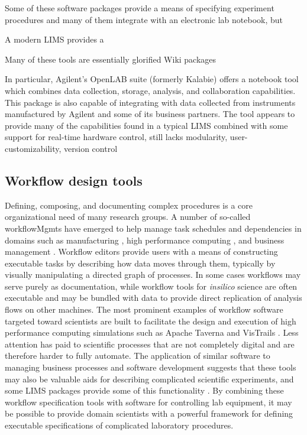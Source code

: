 \documentclass[../thesis]{subfiles}
\begin{document}
Some of these software packages provide a means of specifying
experiment procedures and many of them integrate with an electronic
lab notebook, but

A modern \gls{LIMS} provides a

Many of these tools are essentially glorified Wiki packages

In particular, Agilent's OpenLAB suite (formerly Kalabie) offers a
notebook tool which combines data collection, storage, analysis, and
collaboration capabilities. This package is also capable of
integrating with data collected from instruments manufactured by
Agilent and some of its business partners. The tool appears to provide
many of the capabilities found in a typical \gls{LIMS} combined with some
support for real-time hardware control,
 still lacks modularity, user-customizability, version control




\subsection{Workflow design tools}

Defining, composing, and documenting complex procedures is a core
organizational need of many research groups. A number of so-called
\glspl{workflowMgmt} have emerged to help manage task schedules and
dependencies in domains such as manufacturing
\cite{Allweyer:2010:BPM:1841147}, high performance computing
\cite{VisTrails}, and business management
\cite{cardoso2004workflow}. Workflow editors provide users with a
means of constructing executable tasks by describing how
data moves through them, typically by visually manipulating a directed
graph of processes. In some cases workflows may serve purely as
documentation, while workflow tools for \textit{\gls{insilico}} science
are often executable and may be bundled with data to provide direct
replication of analysis flows on other machines. The most prominent
examples of workflow software
targeted toward scientists are built to facilitate the design and
execution of high performance computing simulations such as Apache
Taverna \cite{Taverna} and VisTrails \cite{VisTrails}. Less
attention has paid to scientific processes that are not completely digital
and are therefore harder to fully automate. The application
of similar software to managing business processes and software
development suggests that these tools may also be valuable aids for
describing complicated scientific experiments, and some \gls{LIMS} packages
provide some of this functionality \cite{CoreLIMS}. By combining these
workflow specification tools with software for controlling lab
equipment, it may be possible to provide domain scientists with a
powerful framework for defining executable specifications of
complicated laboratory procedures.
\end{document}
